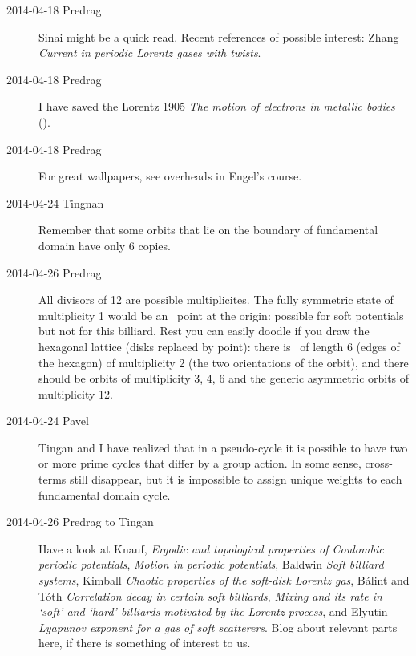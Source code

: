 \begin{description}
\item[2014-04-18 Predrag]
Sinai might be a quick read.
Recent references of possible interest:
Zhang
{\em Current in periodic {Lorentz} gases with twists}.

\item[2014-04-18 Predrag]
I have saved the Lorentz 1905
{\em The motion of electrons in metallic bodies}
().

\item[2014-04-18 Predrag]
For great wallpapers, see overheads in
{Engel's} course.

\item[2014-04-24 Tingnan]
Remember that some orbits that lie on the boundary of fundamental domain
have only 6 copies.

\item[2014-04-26 Predrag]
All divisors of 12 are possible multiplicites. The fully symmetric state
of multiplicity 1 would be an \eqv\ point at the origin: possible for
soft potentials but not for this billiard. Rest you can easily doodle if
you draw the hexagonal lattice (disks replaced by point): there is \po\
of length 6 (edges of the hexagon) of multiplicity 2 (the two
orientations of the orbit), and there should be orbits of multiplicity 3,
4, 6 and the generic asymmetric orbits of multiplicity 12.

\item[2014-04-24 Pavel]
Tingan and I have realized that in a
pseudo-cycle it is possible to have two or more prime cycles that differ
by a group action. In some sense, cross-terms still disappear, but it is
impossible to assign unique weights to each fundamental domain cycle.

\item[2014-04-26 Predrag to Tingan]
Have a look at
Knauf,
{\em Ergodic and topological properties of {Coulombic} periodic potentials},
{\em Motion in periodic potentials},
Baldwin {\em Soft billiard systems},
Kimball
{\em Chaotic properties of the soft-disk {Lorentz} gas},
B\'alint and T\'oth
{\em Correlation decay in certain soft billiards},
{\em Mixing and its rate in `soft' and `hard' billiards
         motivated by the {Lorentz} process},
and
Elyutin
{\em Lyapunov exponent for a gas of soft scatterers}.
Blog about relevant parts here, if there is something of interest
to us.


\end{description}
